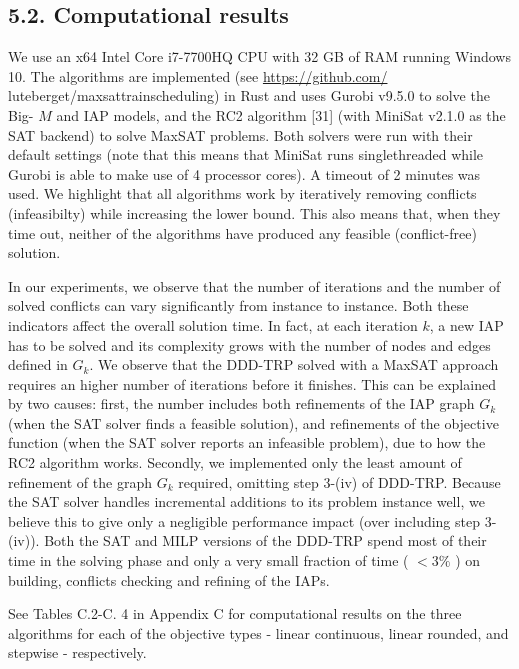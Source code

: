 \documentclass[10pt]{article}
\begin{document}
\subsection*{5.2. Computational results}
We use an x64 Intel Core i7-7700HQ CPU with 32 GB of RAM running Windows 10. The algorithms are implemented (see \href{https://github.com/}{https://github.com/} luteberget/maxsattrainscheduling) in Rust and uses Gurobi v9.5.0 to solve the Big- $M$ and IAP models, and the RC2 algorithm [31] (with MiniSat v2.1.0 as the SAT backend) to solve MaxSAT problems. Both solvers were run with their default settings (note that this means that MiniSat runs singlethreaded while Gurobi is able to make use of 4 processor cores). A timeout of 2 minutes was used. We highlight that all algorithms work by iteratively removing conflicts (infeasibilty) while increasing the lower bound. This also means that, when they time out, neither of the algorithms have produced any feasible (conflict-free) solution.

In our experiments, we observe that the number of iterations and the number of solved conflicts can vary significantly from instance to instance. Both these indicators affect the overall solution time. In fact, at each iteration $k$, a new IAP has to be solved and its complexity grows with the number of nodes and edges defined in $G_{k}$. We observe that the DDD-TRP solved with a MaxSAT approach requires an higher number of iterations before it finishes. This can be explained by two causes: first, the number includes both refinements of the IAP graph $G_{k}$ (when the SAT solver finds a feasible solution), and refinements of the objective function (when the SAT solver reports an infeasible problem), due to how the RC2 algorithm works. Secondly, we implemented only the least amount of refinement of the graph $G_{k}$ required, omitting step 3-(iv) of DDD-TRP. Because the SAT solver handles incremental additions to its problem instance well, we believe this to give only a negligible performance impact (over including step 3-(iv)). Both the SAT and MILP versions of the DDD-TRP spend most of their time in the solving phase and only a very small fraction of time ( $<3 \%$ ) on building, conflicts checking and refining of the IAPs.

See Tables C.2-C. 4 in Appendix C for computational results on the three algorithms for each of the objective types - linear continuous, linear rounded, and stepwise - respectively.
\end{document}
